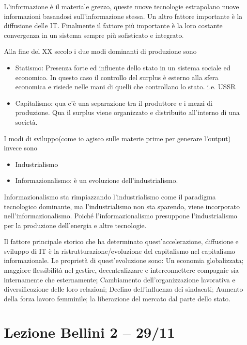 \documentclass[a4page, 11pt]{article}
\begin{document}
L'informazione è il materiale grezzo, queste nuove tecnologie
estrapolano nuove informazioni basandosi sull'informazione stessa. Un
altro fattore importante è la diffusione delle IT. Finalmente il fattore
più importante è la loro costante convergenza in un sistema sempre più
sofisticato e integrato.

Alla fine del XX secolo i due modi dominanti di produzione sono

\begin{itemize}
	 
	\item
	Statismo: Presenza forte ed influente dello stato in un sistema
	sociale ed economico. In questo caso il controllo del surplus è
	esterno alla sfera economica e risiede nelle mani di quelli che
	controllano lo stato. i.e. USSR
	\item
	Capitalismo: qua c'è una separazione tra il produttore e i mezzi di
	produzione. Qua il surplus viene organizzato e distribuito all'interno
	di una società.
\end{itemize}

I modi di sviluppo(come io agisco sulle materie prime per generare
l'output) invece sono

\begin{itemize}
	 
	\item
	Industrialismo
	\item
	Informazionalismo: è un evoluzione dell'industrialismo.
\end{itemize}

Informazionalismo sta rimpiazzando l'industrialismo come il paradigma
tecnologico dominante, ma l'industrialismo non sta sparendo, viene
incorporato nell'informazionalismo. Poiché l'informazionalismo
presuppone l'industrialismo per la produzione dell'energia e altre
tecnologie.

Il fattore principale storico che ha determinato quest'accelerazione,
diffusione e sviluppo di IT è la ristrutturazione/evoluzione del
capitalismo nel capitalismo informazionale. Le proprietà di
quest'evoluzione sono: Un economia globalizzata; maggiore flessibilità
nel gestire, decentralizzare e interconnettere compagnie sia
internamente che esternamente; Cambiamento dell'organizzazione
lavorativa e diversificazione delle loro relazioni; Declino
dell'influenza dei sindacati; Aumento della forza lavoro femminile; la
liberazione del mercato dal parte dello stato.
\section*{Lezione Bellini 2 -- 29/11}
\end{document}
